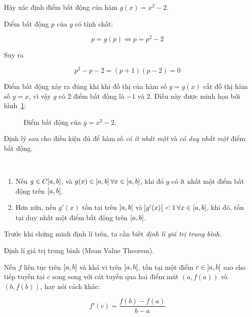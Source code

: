 \documentclass[../../Lectures]{subfiles}
\begin{document}
\begin{exmp}
    Hãy xác định điểm bất động của hàm \(g(x) = x^2 - 2\).

    Điểm bất động \(p\) của \(g\) có tính chất:

    \[p= g(p) \iff p = p^2 - 2\]

    Suy ra

    \[p^2 - p - 2 = (p + 1)(p - 2) = 0\]

    Điểm bất động xảy ra đúng khi khi đồ thị của hàm số \(y = g(x)\) cắt đồ thị
    hàm số \(y = x\), vì vậy \(g\) có 2 điểm bất động là \(-1\) và \(2\). Điều
    này được minh họa bởi hình~\ref{fig:exmp_2.2_fixed_point}:

    \begin{figure}[!h]
        \centering
        
        \caption{Điểm bất động của \(y = x^2 - 2\).}
        \label{fig:exmp_2.2_fixed_point}    %
    \end{figure}
\end{exmp}

Định lý sau cho điều kiện đủ để hàm số \emph{có ít nhất một} và \emph{có duy
nhất một} điểm bất động.

\begin{theorem}\label{thm:sufficient_conditions_of_fixed_point}
\phantom\\
\begin{enumerate}
    \item Nếu \(g \in C \interval{a}{b}\), và \(g(x) \in \interval{a}{b} \,
        \forall x \in \interval{a}{b}\), khi đó \(g\) có ít nhất một điểm bất
        động trên \(\interval{a}{b}\).

    \item Hơn nữa, nếu \(g'(x)\) tồn tại trên \(\interval[open]{a}{b}\) và
        \(\abs{g'(x)} < 1 \, \forall x \in \interval{a}{b}\), khi đó, tồn tại
        duy nhất một điểm bất động trên \(\interval{a}{b}\).
\end{enumerate}
\end{theorem}

Trước khi chứng minh định lí trên, ta cần biết \emph{định lí giá trị trung
bình}.

\begin{theorem}\label{thm:mean_value_theorem}
    Định lí giá trị trung bình (Mean Value Theorem).

    Nếu \(f\) liên tục trên \(\interval{a}{b}\) và khả vi trên
    \(\interval[open]{a}{b}\), tồn tại một điểm \(c \in \interval[open]{a}{b}\)
    sao cho tiếp tuyến tại \(c\) song song với cát tuyến qua hai điểm mút \((a,
    f(a))\) và \((b, f(b))\), hay nói cách khác:

    \[f'(c) = \frac{f(b) - f(a)}{b - a}\]
\end{theorem}
\end{document}
